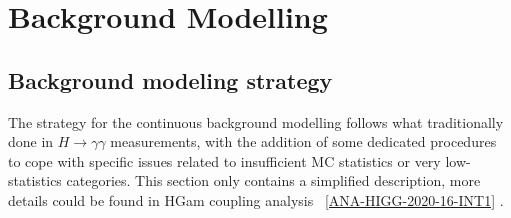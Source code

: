 \section{Background Modelling}
\label{sec:background_model}



\subsection{Background modeling strategy}
\label{ssec:bkg_strategy}
The strategy for the continuous background modelling follows what traditionally done in $H\to\gamma\gamma$ measurements, with the addition of some dedicated procedures to cope with specific issues related to insufficient MC statistics or very low-statistics categories. This section only contains a simplified description, more details could be found in HGam coupling analysis ~\ref{ANA-HIGG-2020-16-INT1} . 

